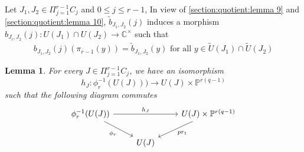 \documentclass[12pt,reqno]{amsart}
\numberwithin{equation}{section}
\newtheorem{lemma}[theorem]{Lemma}
\theoremstyle{definition}
\begin{document}
	Let $J_{1},J_{2}\in\Pi_{j=1}^{r-1}C_{j}$ and $0\leq j\leq r-1$,
	In view of \cref{section:quotient:lemma 9} and \cref{section:quotient:lemma 10}, 
	$\tilde{b}_{J_{1},J_{2}}(j)$ induces a morphism $b_{J_{i},J_{2}}(j):U(J_{1})\cap U(J_{2})\longrightarrow \mathbb{C}^{\times}$ such that \begin{align}\label{eq 5.1.16}
		b_{J_{1},J_{2}}(j)(\pi_{r-1}(y))=\tilde{b}_{J_{1},J_{2}}(y) \text{\ for all \ $y\in \tilde{U}(J_{1})\cap \tilde{U}(J_{2})$}
	\end{align}
	\begin{lemma}\label{section:quotient:lemma 11 }
		For every $J\in \Pi_{j=1}^{r-1}C_{j}$, we have an isomorphism $$h_{J}:\phi_{r}^{-1}(U(J)))\longrightarrow U(J)\times \mathbb{P}^{r(q-1)}$$ such that the following diagram commutes
		\begin{equation}\label{diagram 2}		
		 \begin{tikzcd}
			\phi_{r}^{-1}(U(J)) \arrow{rr}{h_{J}} \arrow[swap]{dr}{\phi_{r}} & & U(J)\times \mathbb{P}^{r(q-1)}\arrow{dl}{pr_{1}} \\%
			&	U(J)
		\end{tikzcd}
		\end{equation}
	\end{lemma}
\end{document}
